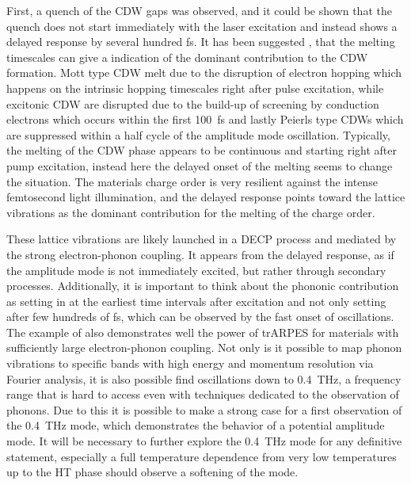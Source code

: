 First, a quench of the CDW gaps was observed, and it could be shown that the quench does not start immediately with the laser excitation and instead shows a delayed response by several hundred \unit{\femto\second}.
It has been suggested \cite{hellmann_time-domain_2012}, that the melting timescales can give a indication of the dominant contribution to the CDW formation.
Mott type CDW melt due to the disruption of electron hopping which happens on the intrinsic hopping timescales right after pulse excitation, while excitonic CDW are disrupted due to the build-up of screening by conduction electrons which occurs within the first \qty{100}{\femto\second} and lastly Peierls type CDWs which are suppressed within a half cycle of the amplitude mode oscillation.
Typically, the melting of the CDW phase appears to be continuous and starting right after pump excitation, instead here the delayed onset of the melting seems to change the situation.
The materials charge order is very resilient against the intense femtosecond light illumination, and the delayed response points toward the lattice vibrations as the dominant contribution for the melting of the charge order. 

These lattice vibrations are likely launched in a DECP process and mediated by the strong electron-phonon coupling.
It appears from the delayed response, as if the amplitude mode is not immediately excited, but rather through secondary processes.
Additionally, it is important to think about the phononic contribution as setting in at the earliest time intervals after excitation and not only setting after few hundreds of \unit{\femto\second}, which can be observed by the fast onset of oscillations.
The example of  also demonstrates well the power of trARPES for materials with sufficiently large electron-phonon coupling.
Not only is it possible to map phonon vibrations to specific bands with high energy and momentum resolution via Fourier analysis, it is also possible find oscillations down to \qty{0.4}{\tera\hertz}, a frequency range that is hard to access even with techniques dedicated to the observation of phonons.
Due to this it is possible to make a strong case for a first observation of the \qty{0.4}{\tera\hertz} mode, which demonstrates the behavior of a potential amplitude mode.
It will be necessary to further explore the \qty{0.4}{\tera\hertz} mode for any definitive statement, especially a full temperature dependence from very low temperatures up to the HT phase should observe a softening of the mode.

